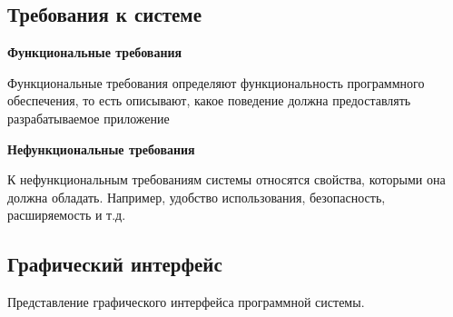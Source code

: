 \subsection{Требования к системе}
\label{subsec:fotmalDefinition}
\textbf{Функциональные требования}

Функциональные требования определяют функциональность программного обеспечения, то есть описывают, какое поведение должна предоставлять разрабатываемое приложение

\textbf{Нефункциональные требования}

К нефункциональным требованиям системы относятся свойства, которыми она должна обладать. Например, удобство использования, безопасность, расширяемость и т.д.

\vspace{1.5em}
\subsection{Графический интерфейс}
\label{subsec:Graphic}
Представление графического интерфейса программной системы.
